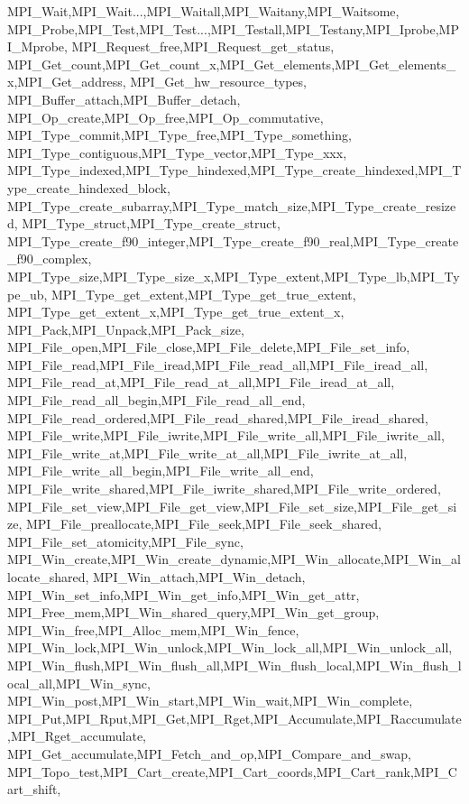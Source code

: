{{{{{    MPI_Wait,MPI_Wait...,MPI_Waitall,MPI_Waitany,MPI_Waitsome,
    MPI_Probe,MPI_Test,MPI_Test...,MPI_Testall,MPI_Testany,MPI_Iprobe,MPI_Mprobe,
    MPI_Request_free,MPI_Request_get_status,
    MPI_Get_count,MPI_Get_count_x,MPI_Get_elements,MPI_Get_elements_x,MPI_Get_address,
    MPI_Get_hw_resource_types,
    MPI_Buffer_attach,MPI_Buffer_detach,
    MPI_Op_create,MPI_Op_free,MPI_Op_commutative,
    MPI_Type_commit,MPI_Type_free,MPI_Type_something,
    MPI_Type_contiguous,MPI_Type_vector,MPI_Type_xxx,
    MPI_Type_indexed,MPI_Type_hindexed,MPI_Type_create_hindexed,MPI_Type_create_hindexed_block,
    MPI_Type_create_subarray,MPI_Type_match_size,MPI_Type_create_resized,
    MPI_Type_struct,MPI_Type_create_struct,
    MPI_Type_create_f90_integer,MPI_Type_create_f90_real,MPI_Type_create_f90_complex,
    MPI_Type_size,MPI_Type_size_x,MPI_Type_extent,MPI_Type_lb,MPI_Type_ub,
    MPI_Type_get_extent,MPI_Type_get_true_extent,
    MPI_Type_get_extent_x,MPI_Type_get_true_extent_x,
    MPI_Pack,MPI_Unpack,MPI_Pack_size,
    MPI_File_open,MPI_File_close,MPI_File_delete,MPI_File_set_info,
    MPI_File_read,MPI_File_iread,MPI_File_read_all,MPI_File_iread_all,
    MPI_File_read_at,MPI_File_read_at_all,MPI_File_iread_at_all,
    MPI_File_read_all_begin,MPI_File_read_all_end,
    MPI_File_read_ordered,MPI_File_read_shared,MPI_File_iread_shared,
    MPI_File_write,MPI_File_iwrite,MPI_File_write_all,MPI_File_iwrite_all,
    MPI_File_write_at,MPI_File_write_at_all,MPI_File_iwrite_at_all,
    MPI_File_write_all_begin,MPI_File_write_all_end,
    MPI_File_write_shared,MPI_File_iwrite_shared,MPI_File_write_ordered,
    MPI_File_set_view,MPI_File_get_view,MPI_File_set_size,MPI_File_get_size,
    MPI_File_preallocate,MPI_File_seek,MPI_File_seek_shared,
    MPI_File_set_atomicity,MPI_File_sync,
    MPI_Win_create,MPI_Win_create_dynamic,MPI_Win_allocate,MPI_Win_allocate_shared,
    MPI_Win_attach,MPI_Win_detach,
    MPI_Win_set_info,MPI_Win_get_info,MPI_Win_get_attr,
    MPI_Free_mem,MPI_Win_shared_query,MPI_Win_get_group,
    MPI_Win_free,MPI_Alloc_mem,MPI_Win_fence,
    MPI_Win_lock,MPI_Win_unlock,MPI_Win_lock_all,MPI_Win_unlock_all,
    MPI_Win_flush,MPI_Win_flush_all,MPI_Win_flush_local,MPI_Win_flush_local_all,MPI_Win_sync,
    MPI_Win_post,MPI_Win_start,MPI_Win_wait,MPI_Win_complete,
    MPI_Put,MPI_Rput,MPI_Get,MPI_Rget,MPI_Accumulate,MPI_Raccumulate,MPI_Rget_accumulate,
    MPI_Get_accumulate,MPI_Fetch_and_op,MPI_Compare_and_swap,
    MPI_Topo_test,MPI_Cart_create,MPI_Cart_coords,MPI_Cart_rank,MPI_Cart_shift,
}}}}}

